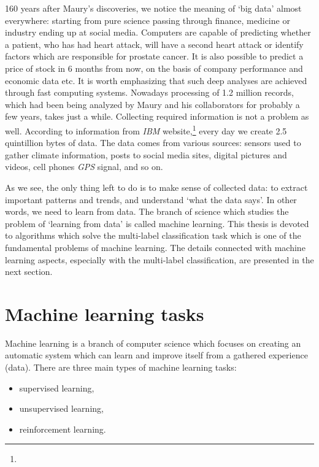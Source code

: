 \documentclass[english,a4paper,twoside]{ppfcmthesis}
\begin{document}
160 years after Maury's discoveries, we notice the meaning of `big data' almost everywhere: starting from pure science passing through finance, medicine or industry ending up at social media. Computers are capable of predicting whether a patient, who has had heart attack, will have a second heart attack or identify factors which are responsible for prostate cancer. It is also possible to predict a price of stock in 6 months from now, on the basis of company performance and economic data etc.
It is worth emphasizing that such deep analyses are achieved through fast computing systems. Nowadays processing of 1.2 million records, which had been being analyzed by Maury and his collaborators for probably a few years, takes just a while. Collecting required information is not a problem as well. According to information from \textit{IBM} website,\footnote{} every day we create 2.5 quintillion bytes of data. The data comes from various sources: sensors used to gather climate information, posts to social media sites, digital pictures and videos, cell phones \textit{GPS} signal, and so on.

As we see, the only thing left to do is to make sense of collected data: to extract important patterns and trends, and understand `what the data says'. In other words, we need to learn from data. The branch of science which studies the problem of `learning from data' is called machine learning. This thesis is devoted to algorithms which solve the multi-label classification task which is one of the fundamental problems of machine learning. The details connected with machine learning aspects, especially with the multi-label classification, are presented in the next section.


\section{Machine learning tasks}

Machine learning is a branch of computer science which focuses on creating an automatic system which can learn and improve itself from a gathered experience (data). There are three main types of machine learning tasks:

\begin{itemize}
\item supervised learning,
\item unsupervised learning,
\item reinforcement learning.
\end{itemize}
\end{document}
